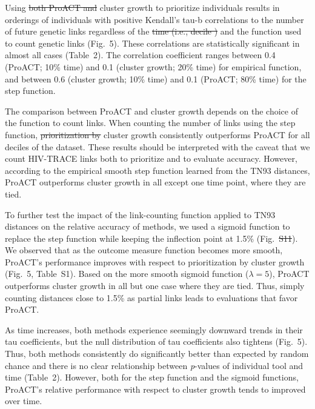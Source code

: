 \documentclass[a4paper,11pt]{article}
\providecommand{\DIFadd}[1]{{\protect\color{blue}\uwave{#1}}} %
\providecommand{\DIFdel}[1]{{\protect\color{red}\sout{#1}}}                      %
\providecommand{\DIFaddbegin}{} %
\providecommand{\DIFaddend}{} %
\providecommand{\DIFdelbegin}{} %
\providecommand{\DIFdelend}{} %
\begin{document}
Using \DIFdelbegin \DIFdel{both ProACT and }\DIFdelend \DIFaddbegin \DIFadd{ProACT or }\DIFaddend cluster growth to prioritize individuals results in orderings of individuals with positive Kendall's tau-b correlations to the number of future genetic links  regardless of the  \DIFdelbegin \DIFdel{time (i.e., decile ) }\DIFdelend \DIFaddbegin \DIFadd{decile }\DIFaddend and the function used to count genetic links (Fig.~5).  
These correlations are statistically significant in almost all cases  (Table~2). 
The  correlation coefficient  ranges between 0.4 (ProACT; 10\% time)  and 0.1 (cluster growth; 20\% time) for empirical function, and 
between 0.6 (cluster growth; 10\% time) and 0.1 (ProACT; 80\% time) for the step function.

The comparison between ProACT and cluster growth depends on the choice of the function to count links. 
When counting the number of links using the step function,
\DIFdelbegin \DIFdel{prioritization by }\DIFdelend cluster growth consistently outperforms ProACT for all deciles of the dataset.
These results should be interpreted with the caveat  that we count HIV-TRACE links both to prioritize and to evaluate accuracy. 
However, 
according to the empirical smooth step function learned from the TN93 distances, ProACT outperforms cluster growth in all except one time point, where they are tied.

To further test the impact of the link-counting function applied to TN93 distances on  the relative accuracy of methods, we used a sigmoid function to replace the step function while keeping the inflection point at 1.5\% (Fig.~\DIFdelbegin \DIFdel{S11}\DIFdelend \DIFaddbegin \DIFadd{S13}\DIFaddend ). 
We observed that as the outcome measure function becomes more smooth,
ProACT's performance improves with respect to prioritization by cluster growth (Fig.~5, Table~S1).
Based on the more smooth sigmoid function ($\lambda=5$), ProACT outperforms cluster growth in all but one case where they are tied.  
Thus, simply counting distances close to 1.5\% as partial links leads to evaluations that favor ProACT.



As time increases, both methods experience seemingly downward trends in their tau coefficients, but the null distribution of tau coefficients also tightens  (Fig.~5). Thus,  both methods consistently do significantly better than expected by random chance and there is no clear relationship between \textit{p}-values of individual tool and time (Table~2).
However, both for the step function and the sigmoid functions, ProACT's relative performance with respect to cluster growth tends to improved over time.
\end{document}
